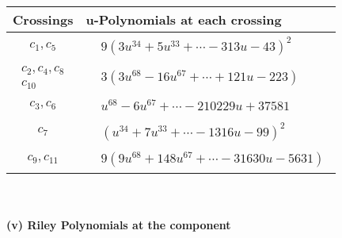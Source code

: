 \documentclass[1p]{elsarticle_modified}
\theoremstyle{definition}
\begin{document}
\begin{tabular}{m{50pt}|m{274pt}}
Crossings & \hspace{64pt}u-Polynomials at each crossing \\
\hline $$\begin{aligned}c_{1},c_{5}\end{aligned}$$&$\begin{aligned}
&9(3 u^{34}+5 u^{33}+\cdots-313 u-43)^{2}
\end{aligned}$\\
\hline $$\begin{aligned}c_{2},c_{4},c_{8}\\c_{10}\end{aligned}$$&$\begin{aligned}
&3(3 u^{68}-16 u^{67}+\cdots+121 u-223)
\end{aligned}$\\
\hline $$\begin{aligned}c_{3},c_{6}\end{aligned}$$&$\begin{aligned}
&u^{68}-6 u^{67}+\cdots-210229 u+37581
\end{aligned}$\\
\hline $$\begin{aligned}c_{7}\end{aligned}$$&$\begin{aligned}
&(u^{34}+7 u^{33}+\cdots-1316 u-99)^{2}
\end{aligned}$\\
\hline $$\begin{aligned}c_{9},c_{11}\end{aligned}$$&$\begin{aligned}
&9(9 u^{68}+148 u^{67}+\cdots-31630 u-5631)
\end{aligned}$\\
\hline
\end{tabular}\\~\\
\newpage\renewcommand{\arraystretch}{1}
\flushleft \textbf{(v) Riley Polynomials at the component}\newline \\
\end{document}

